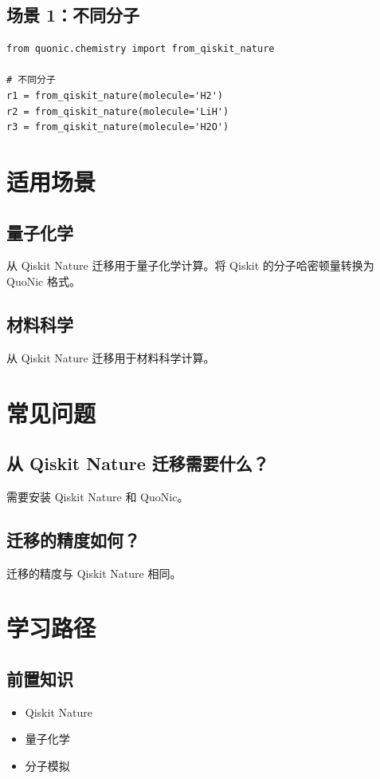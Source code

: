 \documentclass[12pt,a4paper]{article}
\begin{document}
\subsection{场景 1：不同分子}

\begin{verbatim}
from quonic.chemistry import from_qiskit_nature

# 不同分子
r1 = from_qiskit_nature(molecule='H2')
r2 = from_qiskit_nature(molecule='LiH')
r3 = from_qiskit_nature(molecule='H2O')
\end{verbatim}

\section{适用场景}

\subsection{量子化学}

从 Qiskit Nature 迁移用于量子化学计算。将 Qiskit 的分子哈密顿量转换为 QuoNic 格式。

\subsection{材料科学}

从 Qiskit Nature 迁移用于材料科学计算。

\section{常见问题}

\subsection{从 Qiskit Nature 迁移需要什么？}

需要安装 Qiskit Nature 和 QuoNic。

\subsection{迁移的精度如何？}

迁移的精度与 Qiskit Nature 相同。

\section{学习路径}

\subsection{前置知识}
\begin{itemize}
  \item Qiskit Nature
  \item 量子化学
  \item 分子模拟
\end{itemize}
\end{document}
